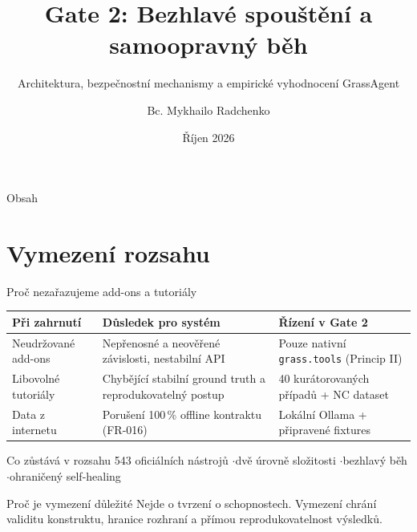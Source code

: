 \documentclass[aspectratio=169,11pt]{beamer}
\title[Gate 2]{Gate 2: Bezhlavé spouštění a samoopravný běh}
\subtitle{Architektura, bezpečnostní mechanismy a empirické vyhodnocení GrassAgent}
\author[Bc. Mykhailo Radchenko]{Bc. Mykhailo Radchenko}
\institute[GrassAgent]{Projekt GrassAgent}
\date{Říjen 2026}
\begin{document}
\begin{frame}[plain]
  \titlepage
\end{frame}

\begin{frame}{Obsah}
  \tableofcontents
\end{frame}

\section{Vymezení rozsahu}

\begin{frame}[t]{Proč nezařazujeme add-ons a tutoriály}
  \small
  \begin{table}
    \centering
    \footnotesize
    \begin{tabular}{@{}p{3.8cm}p{4.5cm}p{5.1cm}@{}}
      \toprule
      \textbf{Při zahrnutí} & \textbf{Důsledek pro systém} & \textbf{Řízení v Gate 2} \\
      \midrule
      Neudržované add-ons
        & Nepřenosné a neověřené závislosti, nestabilní API
        & Pouze nativní \texttt{grass.tools} (Princip II) \\
      Libovolné tutoriály
        & Chybějící stabilní ground truth a reprodukovatelný postup
        & 40 kurátorovaných případů + NC dataset \\
      Data z internetu
        & Porušení 100\,\% offline kontraktu (FR-016)
        & Lokální Ollama + připravené fixtures \\
      \bottomrule
    \end{tabular}
  \end{table}

  \vspace{1mm}
  \begin{block}{Co zůstává v rozsahu}
    543 oficiálních nástrojů \quad$\cdot$\quad dvě úrovně složitosti
    \quad$\cdot$\quad bezhlavý běh \quad$\cdot$\quad ohraničený self-healing
  \end{block}

  \begin{alertblock}{Proč je vymezení důležité}
    Nejde o tvrzení o schopnostech. Vymezení chrání validitu konstruktu,
    hranice rozhraní a přímou reprodukovatelnost výsledků.
  \end{alertblock}
\end{frame}
\end{document}

